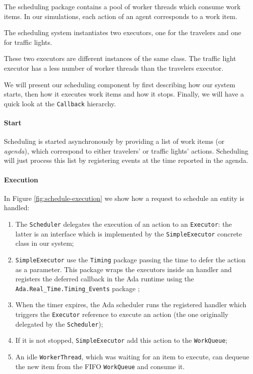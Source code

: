 The scheduling package contains a pool of worker threads
which consume work items. In our
simulations, each action of an agent corresponds to a work item.

The scheduling system instantiates two executors, one for the travelers and
one for traffic lights.

These two executors are different instances of the same class.
The traffic light executor has a less number of worker threads
than the travelers executor.

We will present our scheduling component by first describing how our system
starts, then how it executes work items and how it stops.
Finally, we will have a quick look at the \texttt{Callback} hierarchy.

\paragraph{Start}

Scheduling is started asynchronously by providing a list of work items
(or \textit{agenda}), which correspond to either travelers' or traffic
lights' actions.
Scheduling will just process this list by registering events at the time
reported in the agenda.

\paragraph{Execution}

In Figure \ref{fig:schedule-execution} we show how a request to schedule
an entity is handled:

\begin{enumerate}
  \item The \texttt{Scheduler} delegates the execution of an action to
    an \texttt{Executor}: the latter is an interface which is implemented by
    the \texttt{SimpleExecutor} concrete class in our system;
  \item \texttt{SimpleExecutor} use the \texttt{Timing} package passing
  the time to defer the action as a parameter. This package
  wraps the executors inside an handler and registers the deferred callback
  in the Ada runtime using the \texttt{Ada.Real\_Time.Timing\_Events} package
  \cite{taft2006ada};
  \item When the timer expires, the Ada scheduler runs the registered handler
  which triggers the \texttt{Executor} reference to
  execute an action (the one originally delegated by the \texttt{Scheduler});
  \item If it is not stopped, \texttt{SimpleExecutor} add this action to the
    \texttt{WorkQueue};
  \item An idle \texttt{WorkerThread}, which was waiting for an item to
    execute, can dequeue the new item from the FIFO \texttt{WorkQueue}
    and consume it.
\end{enumerate}

